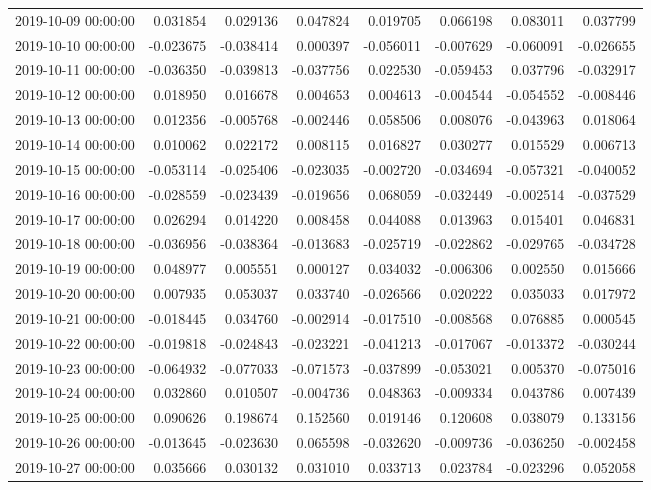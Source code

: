 \begin{tabular}{lrrrrrrr}
2019-10-09 00:00:00 & 0.031854 & 0.029136 & 0.047824 & 0.019705 & 0.066198 & 0.083011 & 0.037799 \\
2019-10-10 00:00:00 & -0.023675 & -0.038414 & 0.000397 & -0.056011 & -0.007629 & -0.060091 & -0.026655 \\
2019-10-11 00:00:00 & -0.036350 & -0.039813 & -0.037756 & 0.022530 & -0.059453 & 0.037796 & -0.032917 \\
2019-10-12 00:00:00 & 0.018950 & 0.016678 & 0.004653 & 0.004613 & -0.004544 & -0.054552 & -0.008446 \\
2019-10-13 00:00:00 & 0.012356 & -0.005768 & -0.002446 & 0.058506 & 0.008076 & -0.043963 & 0.018064 \\
2019-10-14 00:00:00 & 0.010062 & 0.022172 & 0.008115 & 0.016827 & 0.030277 & 0.015529 & 0.006713 \\
2019-10-15 00:00:00 & -0.053114 & -0.025406 & -0.023035 & -0.002720 & -0.034694 & -0.057321 & -0.040052 \\
2019-10-16 00:00:00 & -0.028559 & -0.023439 & -0.019656 & 0.068059 & -0.032449 & -0.002514 & -0.037529 \\
2019-10-17 00:00:00 & 0.026294 & 0.014220 & 0.008458 & 0.044088 & 0.013963 & 0.015401 & 0.046831 \\
2019-10-18 00:00:00 & -0.036956 & -0.038364 & -0.013683 & -0.025719 & -0.022862 & -0.029765 & -0.034728 \\
2019-10-19 00:00:00 & 0.048977 & 0.005551 & 0.000127 & 0.034032 & -0.006306 & 0.002550 & 0.015666 \\
2019-10-20 00:00:00 & 0.007935 & 0.053037 & 0.033740 & -0.026566 & 0.020222 & 0.035033 & 0.017972 \\
2019-10-21 00:00:00 & -0.018445 & 0.034760 & -0.002914 & -0.017510 & -0.008568 & 0.076885 & 0.000545 \\
2019-10-22 00:00:00 & -0.019818 & -0.024843 & -0.023221 & -0.041213 & -0.017067 & -0.013372 & -0.030244 \\
2019-10-23 00:00:00 & -0.064932 & -0.077033 & -0.071573 & -0.037899 & -0.053021 & 0.005370 & -0.075016 \\
2019-10-24 00:00:00 & 0.032860 & 0.010507 & -0.004736 & 0.048363 & -0.009334 & 0.043786 & 0.007439 \\
2019-10-25 00:00:00 & 0.090626 & 0.198674 & 0.152560 & 0.019146 & 0.120608 & 0.038079 & 0.133156 \\
2019-10-26 00:00:00 & -0.013645 & -0.023630 & 0.065598 & -0.032620 & -0.009736 & -0.036250 & -0.002458 \\
2019-10-27 00:00:00 & 0.035666 & 0.030132 & 0.031010 & 0.033713 & 0.023784 & -0.023296 & 0.052058 \\

\end{tabular}
